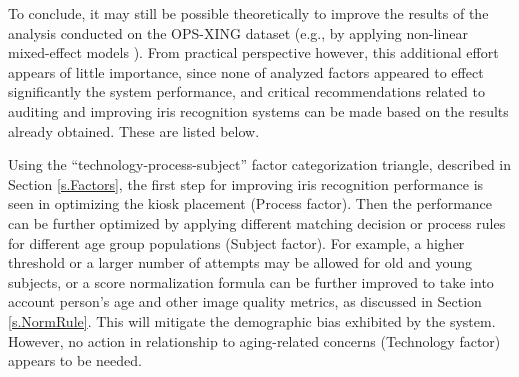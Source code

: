 \documentclass{cta-author}%
\begin{document}
To conclude, 
it may still be possible theoretically to improve  the results of the analysis conducted on the OPS-XING dataset (e.g., by applying non-linear mixed-effect models \cite{R-book}).
From practical perspective however, 
this additional effort appears of little importance, 
since none of analyzed factors appeared to effect significantly the system performance,
and
critical recommendations related to auditing and 
improving  iris recognition systems 
can  be made 
based on the results already obtained. 
These are listed below.

Using the ``technology-process-subject'' factor categorization triangle, described in Section \ref{s.Factors}, 
the first 
step for improving iris recognition performance is seen in optimizing the kiosk placement (Process factor). 
Then the performance can be further optimized by applying different matching decision or process rules for different age group populations (Subject factor). 
For example, 
a higher threshold or a larger number of attempts may be allowed for old and young subjects,
or  a score normalization formula can be further improved to take into account person's age and other image quality metrics, as discussed in Section \ref{s.NormRule}. This will mitigate the demographic bias exhibited by the system.
However, no action in relationship to aging-related concerns (Technology factor) appears to be needed.

\end{document}
